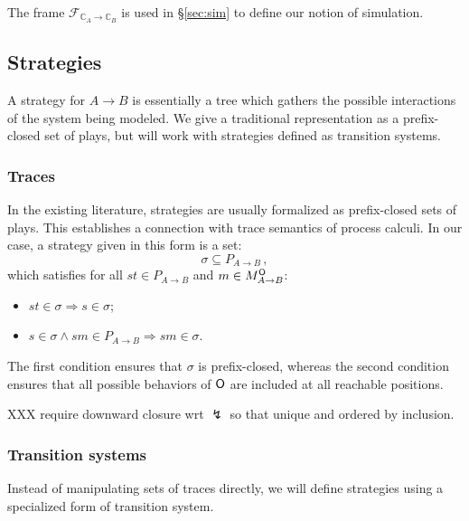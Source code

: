 The frame $\mathcal{F}_{\mathbb{C}_A \rightarrow \mathbb{C}_B}$
is used in \S\ref{sec:sim}
to define our notion of simulation.



\subsection{Strategies} %

A strategy for $A \rightarrow B$
is essentially a tree
which gathers the possible interactions of
the system being modeled.
We give a traditional representation
as a prefix-closed set of plays,
but will work with strategies defined as transition systems.

\subsubsection{Traces} %

In the existing literature,
strategies are usually formalized as prefix-closed sets of plays.
This establishes a connection with trace semantics of process calculi.
In our case,
a strategy given in this form is a set:
\[ \sigma \subseteq P_{A \rightarrow B} \,, \]
which satisfies
for all $st \in P_{A \rightarrow B}$
and $m \in M_{A \rightarrow B}^{ \mathsf{O} }$:
\begin{itemize}
  \item $st \in \sigma \Rightarrow s \in \sigma$;
  \item $s \in \sigma \wedge sm \in P_{A \rightarrow B}
    \Rightarrow sm \in \sigma$.
\end{itemize}
The first condition ensures that $\sigma$ is prefix-closed,
whereas the second condition ensures that
all possible behaviors of $ \mathsf{O} $ are included
at all reachable positions.

XXX require downward closure wrt $\lightning$
so that unique and ordered by inclusion.


\subsubsection{Transition systems} %

Instead of manipulating sets of traces directly,
we will define strategies using a specialized form of transition system.

